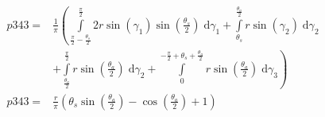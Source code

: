 \begin{align}
    p343 =&\frac{1}{\pi} \left(\int\limits_{\frac{\pi}{2} - \frac{\theta_{s}}{2}}^{\frac{\pi}{2}}2 r \sin{\left (\gamma_{1} \right )} \sin{\left (\frac{\theta_{s}}{2} \right )}\;\mathrm{d}\gamma_{1}+\int\limits_{\theta_{s}}^{\frac{\theta_{a}}{2}}r \sin{\left (\gamma_{2} \right )}\;\mathrm{d}\gamma_{2}\right.\\
 &\left.+\int\limits_{\frac{\theta_{a}}{2}}^{\frac{\pi}{2}}r \sin{\left (\frac{\theta_{a}}{2} \right )}\;\mathrm{d}\gamma_{2}+\int\limits_{0}^{- \frac{\pi}{2} + \theta_{s} + \frac{\theta_{a}}{2}}r \sin{\left (\frac{\theta_{a}}{2} \right )}\;\mathrm{d}\gamma_{3}\right)\\
    p343 =& \frac{r}{\pi} \left(\theta_{s} \sin{\left (\frac{\theta_{a}}{2} \right )} - \cos{\left (\frac{\theta_{a}}{2} \right )} + 1\right)
\end{align}